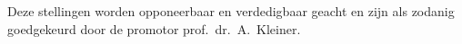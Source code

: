 \documentclass{propositions}
\begin{document}
{\bigskip
\bigskip

\begin{center}
Deze stellingen worden opponeerbaar en verdedigbaar geacht en zijn als zodanig goedgekeurd door de promotor prof.\ dr.\ A.\ Kleiner.
\end{center}

}
\end{document}
